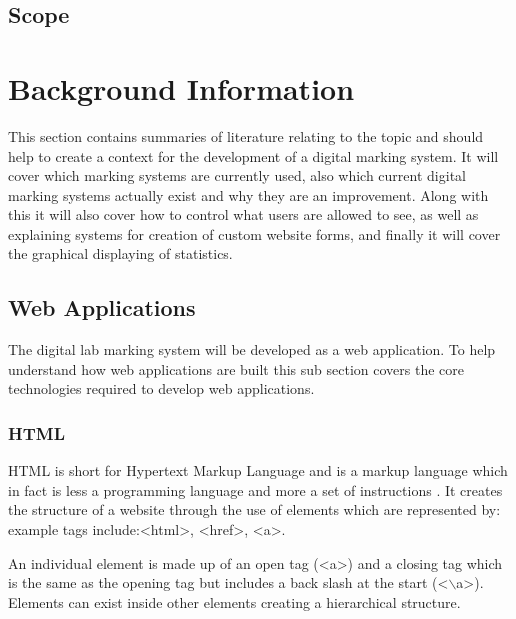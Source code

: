 \documentclass[12pt]{article}  %
\newcommand{\tag}[1]{\textless {#1}\textgreater}
\begin{document}
\subsection{Scope}





\newpage
\section{Background Information}
This section contains summaries of literature relating to the topic and should help to create a context for the development of a digital marking system. It will cover which marking systems are currently used, also which current digital marking systems actually exist and why they are an improvement. Along with this it will also cover how to control what users are allowed to see, as well as explaining systems for creation of custom website forms, and finally it will cover the graphical displaying of statistics. 


\subsection{Web Applications}

The digital lab marking system will be developed as a web application. To help understand how web applications are built this sub section covers the core technologies required to develop web applications.

\subsubsection{HTML}
HTML is short for Hypertext Markup Language and is a markup language which in fact is less a programming language and more a set of instructions \cite{brooks_introduction_2007}. It creates the structure of a website through the use of elements which are represented by: example tags include:\tag{html}, \tag{href}, \tag{a}. 

\noindent An individual element is made up of an open tag (\tag{a}) and a closing tag which is the same as the opening tag but includes a back slash at the start (\tag{$\backslash$a}). Elements can exist inside other elements creating a hierarchical structure.
\end{document}
